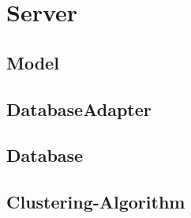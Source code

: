 
\section{Server}
	\subsection{Model}
	\subsection{DatabaseAdapter}
	\subsection{Database}
	\subsection{Clustering-Algorithm}
	\newpage
